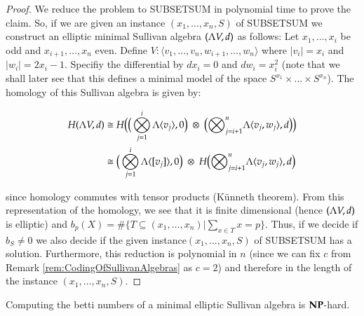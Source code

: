  \begin{proof}
  We reduce the problem to SUBSETSUM in polynomial time to prove the claim.
  So, if we are given an instance $(x_1, \ldots, x_n, S)$ of SUBSETSUM we construct an elliptic minimal Sullivan
  algebra $(\Lambda V,d)$ as follows: \newline
  Let $x_1, \ldots, x_i$ be odd and $x_{i+1}, \ldots, x_n$ even. Define 
  $V \colon \langle v_1, \ldots, v_n, w_{i+1}, \ldots , w_n \rangle$ where $|v_i| = x_i$ and $|w_i| = 2x_i -1$.
  Specifiy the differential by $dx_i = 0$ and $dw_i = x_i^2$ (note that we shall later see that this defines 
  a minimal model of the space $S^{x_1} \times \ldots \times S^{x_n}$). The homology of this Sullivan algebra is given by:
   
  \begin{align*}
  H (\Lambda V,d) &\cong H \big{(} \big{(}\bigotimes_{j = 1}^i \Lambda \langle v_j \rangle , 0 \big{)} \;\otimes \;  
  \big{(} {\bigotimes}_{j=i + 1}^n \Lambda \langle v_{j} ,w_{j}\rangle , d \big{)} \big{)}  \\
  &\cong \big{(} \bigotimes_{j = 1}^i \Lambda \langle [v_j] \rangle , 0 \big{)}
  \; \otimes \;H \big{(}  {\bigotimes}_{j=i + 1}^n \Lambda \langle v_{j} ,w_{j}\rangle  , d\big{)}
  \end{align*}
  
  since homology commutes with tensor products (Künneth theorem). From this representation of the homology,
  we see that it is finite dimensional (hence $(\Lambda V,d)$ is elliptic) and 
  ${b_p(X) = \# {\lbrace T \subseteq (x_1, \ldots, x_n) | \sum_{x \in T} x = p \rbrace}}$.
  Thus, if we decide if $b_S \neq 0$ we also decide if the given instance$(x_1, \ldots, x_n, S)$ of SUBSETSUM
  has a solution. Furthermore, this reduction is polynomial in $n$ 
  (since we can fix $c$ from Remark \ref{rem:CodingOfSullivanAlgebras} as $c = 2$)
  and therefore in the length of the instance $(x_1, \ldots, x_n, S)$. 
 \end{proof}

 \begin{Corollary}
  Computing the betti numbers of a minimal elliptic Sullivan algebra is $\mathbf{NP}$-hard.
 \end{Corollary}
